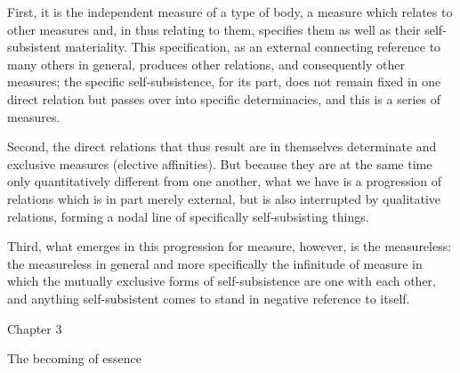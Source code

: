 First, it is the independent measure of a type of body,
a measure which relates to other measures
and, in thus relating to them, specifies them as
well as their self-subsistent materiality.
This specification, as an external
connecting reference to many others in general,
produces other relations, and consequently other measures;
the specific self-subsistence, for its part,
does not remain fixed in one direct relation
but passes over into specific determinacies,
and this is a series of measures.

Second, the direct relations that thus result are in themselves
determinate and exclusive measures (elective affinities).
But because they are at the same time only
quantitatively different from one another,
what we have  is a progression of relations
which is in part merely external,
but is also interrupted by qualitative relations,
forming a nodal line of specifically self-subsisting things.

Third, what emerges in this progression for measure, however,
is the measureless:
the measureless in general and more specifically
the infinitude of measure in which the mutually exclusive
forms of self-subsistence are one with each other,
and anything self-subsistent comes to stand
in negative reference to itself.

Chapter 3

The becoming of essence
